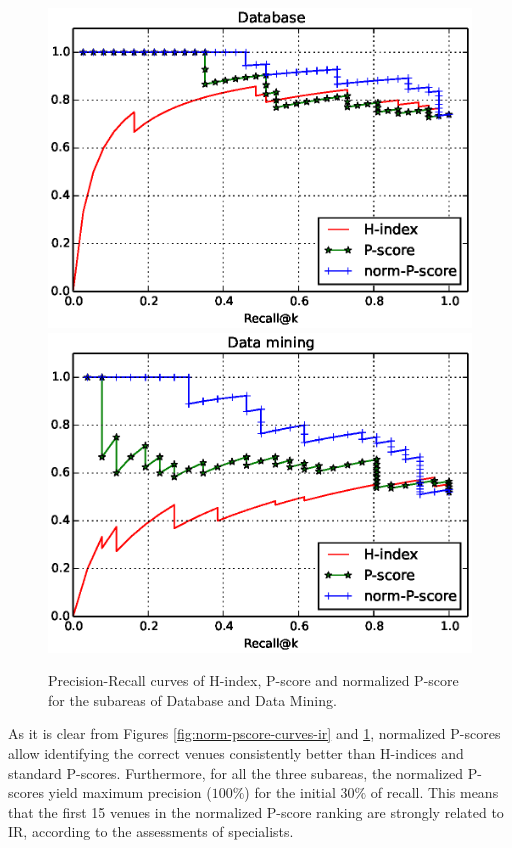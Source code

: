 \documentclass[msc]{ppgccufmg}
\begin{document}
\begin{figure}[htbp]
	\centering
    \label{fig:norm-pscore-curves-db-dm}
    \includegraphics[width=0.8\linewidth]{fig/db-prec-recall.eps}
    \includegraphics[width=0.8\linewidth]{fig/dm-prec-recall.eps}
    \caption{Precision-Recall curves of H-index, P-score and normalized P-score for the subareas of Database and Data Mining.}
\end{figure}


As it is clear from Figures \ref{fig:norm-pscore-curves-ir} and \ref{fig:norm-pscore-curves-db-dm}, normalized P-scores allow identifying the correct venues consistently better than H-indices and standard P-scores. Furthermore, for all the three subareas, the normalized P-scores yield maximum precision ($100\%$) for the initial $30\%$ of recall. This 
means that the first 15 venues in the normalized P-score ranking are strongly related to IR, according to the assessments of specialists.
\end{document}
